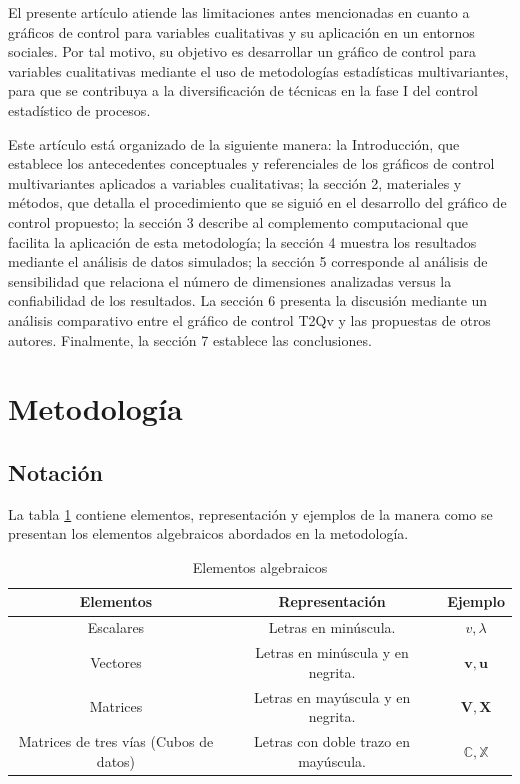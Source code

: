 \documentclass[mathematics,article,submit,moreauthors,pdftex]{mdpi}
\begin{document}
El presente artículo atiende las limitaciones antes mencionadas en
cuanto a gráficos de control para variables cualitativas y su aplicación
en un entornos sociales. Por tal motivo, su objetivo es desarrollar un
gráfico de control para variables cualitativas mediante el uso de
metodologías estadísticas multivariantes, para que se contribuya a la
diversificación de técnicas en la fase I del control estadístico de
procesos.

Este artículo está organizado de la siguiente manera: la Introducción,
que establece los antecedentes conceptuales y referenciales de los
gráficos de control multivariantes aplicados a variables cualitativas;
la sección 2, materiales y métodos, que detalla el procedimiento que se
siguió en el desarrollo del gráfico de control propuesto; la sección 3
describe al complemento computacional que facilita la aplicación de esta
metodología; la sección 4 muestra los resultados mediante el análisis de
datos simulados; la sección 5 corresponde al análisis de sensibilidad
que relaciona el número de dimensiones analizadas versus la
confiabilidad de los resultados. La sección 6 presenta la discusión
mediante un análisis comparativo entre el gráfico de control T2Qv y las
propuestas de otros autores. Finalmente, la sección 7 establece las
conclusiones.

\hypertarget{metodologuxeda}{%
\section{Metodología}\label{metodologuxeda}}

\hypertarget{notaciuxf3n}{%
\subsection{Notación}\label{notaciuxf3n}}

La tabla \ref{tab:notacion} contiene elementos, representación y
ejemplos de la manera como se presentan los elementos algebraicos
abordados en la metodología.

\begin{table}[!ht]
\begin{center}
 \begin{tabular}{||c ||c |c ||} 
 \hline
 Elementos & Representación & Ejemplo \\
 \hline\hline
 Escalares & Letras en minúscula. & $v,\lambda$\\
\hline
Vectores & Letras en minúscula y en negrita. & $\mathbf{v},\mathbf{u}$\\
\hline
Matrices & Letras en mayúscula y en negrita. & $\mathbf{V},\mathbf{X}$\\
\hline
Matrices de tres vías (Cubos de datos) & Letras con doble trazo en mayúscula. & $\mathbb{C},\mathbb{X}$\\
\hline
\end{tabular}\caption{Elementos algebraicos}
\label{tab:notacion}
\end{center}
\end{table}
\end{document}
